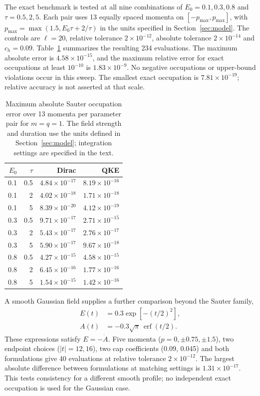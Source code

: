 \documentclass[anonymous]{iopjournal}
\begin{document}
The exact benchmark is tested at all nine combinations of $E_0=0.1,0.3,0.8$ and $\tau=0.5,2,5$. Each pair uses 13 equally spaced momenta on $[-p_{\max},p_{\max}]$, with $p_{\max}=\max(1.5,E_0\tau+2/\tau)$ in the units specified in Section~\ref{sec:model}. The controls are $\ell=20$, relative tolerance $2\times10^{-12}$, absolute tolerance $2\times10^{-14}$ and $c_h=0.09$. Table~\ref{tab:parameter} summarizes the resulting 234 evaluations. The maximum absolute error is $4.58\times10^{-15}$, and the maximum relative error for exact occupations at least $10^{-10}$ is $1.83\times10^{-9}$. No negative occupations or upper-bound violations occur in this sweep. The smallest exact occupation is $7.81\times10^{-19}$; relative accuracy is not asserted at that scale.

\begin{table}[htbp]
\centering\small
\caption{Maximum absolute Sauter occupation error over 13 momenta per parameter pair for $m=q=1$. The field strength and duration use the units defined in Section~\ref{sec:model}; integration settings are specified in the text.}
\label{tab:parameter}
\begin{tabular}{rrrr}\toprule
$E_0$ & $\tau$ & Dirac & QKE\\\midrule
0.1 & 0.5 & $4.84\times10^{-17}$ & $8.19\times10^{-16}$\\
0.1 & 2 & $4.02\times10^{-18}$ & $1.71\times10^{-18}$\\
0.1 & 5 & $8.39\times10^{-20}$ & $4.12\times10^{-19}$\\
0.3 & 0.5 & $9.71\times10^{-17}$ & $2.71\times10^{-15}$\\
0.3 & 2 & $5.43\times10^{-17}$ & $2.76\times10^{-17}$\\
0.3 & 5 & $5.90\times10^{-17}$ & $9.67\times10^{-18}$\\
0.8 & 0.5 & $4.27\times10^{-15}$ & $4.58\times10^{-15}$\\
0.8 & 2 & $6.45\times10^{-16}$ & $1.77\times10^{-16}$\\
0.8 & 5 & $1.54\times10^{-15}$ & $1.42\times10^{-16}$\\
\bottomrule\end{tabular}
\end{table}

A smooth Gaussian field supplies a further comparison beyond the Sauter family,
\begin{align}
E(t)&=0.3\exp[-(t/2)^2],\nonumber\\
A(t)&=-0.3\sqrt{\pi}\,\operatorname{erf}(t/2).
\label{eq:gaussian}
\end{align}
These expressions satisfy $E=-\dot A$. Five momenta ($p=0,\pm0.75,\pm1.5$), two endpoint choices ($|t|=12,16$), two cap coefficients (0.09, 0.045) and both formulations give 40 evaluations at relative tolerance $2\times10^{-12}$. The largest absolute difference between formulations at matching settings is $1.31\times10^{-17}$. This tests consistency for a different smooth profile; no independent exact occupation is used for the Gaussian case.
\end{document}
